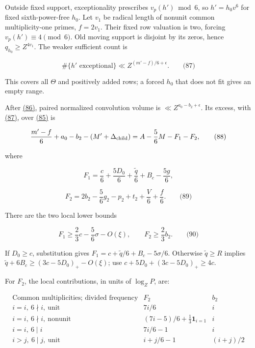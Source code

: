Outside fixed support, exceptionality prescribes \(v_p(h')\bmod6\), so \(h'=h_0v^6\) for fixed sixth-power-free \(h_0\). Let \(v_1\) be radical length of nonunit common multiplicity-one primes, \(f=2v_1\). Their fixed row valuation is two, forcing \(v_p(h')\equiv4\pmod6\). Old moving support is disjoint by its zeros, hence \(q_{h_0}\ge Z^{4v_1}\). The weaker sufficient count is

\hypertarget{cf:eq:D.23}{}

\label{cf:eq:D.23}

\[
\#\{h'\text{ exceptional}\}\ll Z^{(m'-f)/6+\epsilon}.
\qquad\text{(87)}
\]

This covers all \(\Theta\) and positively added rows; a forced \(h_0\) that does not fit gives an empty range.

After \protect\hyperlink{cf:eq:D.22}{(86)}, paired normalized convolution volume is \(\ll Z^{a_0-b_2+\epsilon}\). Its excess, with \protect\hyperlink{cf:eq:D.23}{(87)}, over \protect\hyperlink{cf:eq:D.21}{(85)} is

\hypertarget{cf:eq:D.24}{}

\label{cf:eq:D.24}

\[
\frac{m'-f}{6}+a_0-b_2-(M'+\Delta_{\rm child})
=A-\frac56M-F_1-F_2,
\qquad\text{(88)}
\]

where

\[
F_1=\frac c6+\frac{5D_0}{6}+\frac{\widetilde q}{6}+B_c-\frac{5g}{6},
\]

\hypertarget{cf:eq:D.25}{}

\label{cf:eq:D.25}

\[
F_2=2b_2-\frac56g_2-p_2+t_2+\frac V6+\frac f6.
\qquad\text{(89)}
\]

There are the two local lower bounds

\hypertarget{cf:eq:D.26}{}

\label{cf:eq:D.26}

\[
F_1\ge\frac23c-\frac56\sigma-O(\xi),\qquad F_2\ge\frac23b_2.
\qquad\text{(90)}
\]

If \(D_0\ge c\), substitution gives \(F_1=c+\widetilde q/6+B_c-5\sigma/6\). Otherwise \(\widetilde q\ge R\) implies \(\widetilde q+6B_c\ge(3c-5D_0)_+-O(\xi)\); use \(c+5D_0+(3c-5D_0)_+\ge4c\).

For \(F_2\), the local contributions, in units of \(\log_ZP\), are:

\[
\begin{array}{c|c|c}
\text{Common multiplicities; divided frequency}&F_2&b_2\\\hline
i=i,\ 6\nmid i,\ \text{unit}&7i/6&i\\
i=i,\ 6\nmid i,\ \text{nonunit}&(7i-5)/6+\tfrac13\mathbf1_{i=1}&i\\
i=i,\ 6\mid i&7i/6-1&i\\
i>j,\ 6\mid j,\ \text{unit}&i+j/6-1&(i+j)/2
\end{array}
\]

